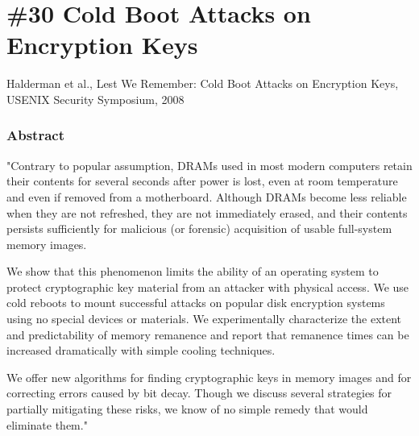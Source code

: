 \section{\#30 Cold Boot Attacks on Encryption Keys}
Halderman et al., Lest We Remember: Cold Boot Attacks on Encryption Keys, USENIX Security Symposium, 2008
\subsubsection{Abstract}
"Contrary to popular assumption, DRAMs used in most modern computers retain their contents for several seconds after power is lost,
even at room temperature and even if removed from a motherboard. Although DRAMs become less reliable when they are not refreshed,
they are not immediately erased, and their contents persists sufficiently for malicious (or forensic) acquisition of usable full-system
memory images.

We show that this phenomenon limits the ability of an operating system to protect cryptographic key material from an attacker
with physical access. We use cold reboots to mount successful attacks on popular disk encryption systems using no special devices or
materials. We experimentally characterize the extent and predictability of memory remanence and report that remanence times can be
increased dramatically with simple cooling techniques.

We offer new algorithms for finding cryptographic keys in memory images and for correcting errors caused by bit decay.
Though we discuss several strategies for partially mitigating these risks, we know of no simple remedy that would eliminate them."

